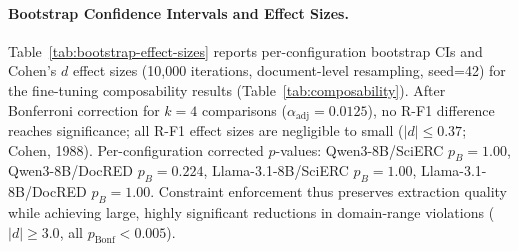 
\paragraph{Bootstrap Confidence Intervals and Effect Sizes.}
\label{app:bootstrap-effect-sizes}

Table~\ref{tab:bootstrap-effect-sizes} reports per-configuration bootstrap CIs and Cohen's $d$ effect sizes (10{,}000 iterations, document-level resampling, seed=42) for the fine-tuning composability results (Table~\ref{tab:composability}).
After Bonferroni correction for $k{=}4$ comparisons ($\alpha_{\text{adj}}{=}0.0125$), no R-F1 difference reaches significance; all R-F1 effect sizes are negligible to small ($|d| \leq 0.37$; Cohen, 1988).
Per-configuration corrected $p$-values: Qwen3-8B/SciERC $p_B{=}1.00$, Qwen3-8B/DocRED $p_B{=}0.224$, Llama-3.1-8B/SciERC $p_B{=}1.00$, Llama-3.1-8B/DocRED $p_B{=}1.00$.
Constraint enforcement thus preserves extraction quality while achieving large, highly significant reductions in domain-range violations ($|d| \geq 3.0$, all $p_{\text{Bonf}} < 0.005$).

\begin{table}[t]
\centering
\small
\setlength{\tabcolsep}{3pt}
\caption{Bootstrap CIs and Cohen's $d$ for Table~\ref{tab:composability} (10{,}000 iterations, document-level resampling, seed=42).
$d$: Cohen's $d$ from pooled bootstrap SD.
Top: R-F1 (S1 $-$ unconstrained); no comparison significant after Bonferroni correction ($k{=}4$, $\alpha_{\text{adj}}{=}0.0125$); $|d| \leq 0.37$ (negligible--small).
Bottom: DR\% reduction; all $p_{\text{Bonf}} < 0.005$, $|d| \geq 3.0$ (large).}
\label{tab:bootstrap-effect-sizes}
\end{table}

